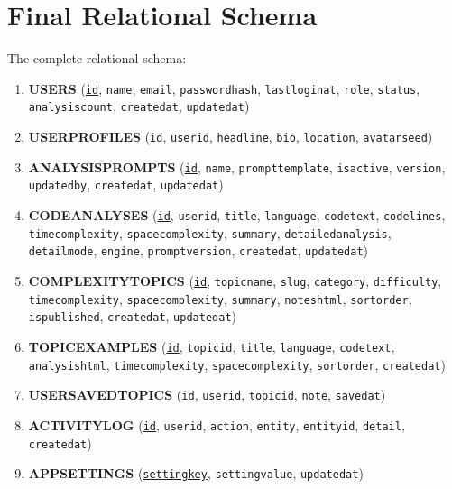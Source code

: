 \documentclass[12pt,a4paper]{report}
\DeclareRobustCommand{\_}{\textunderscore\allowbreak}
\begin{document}
\section{Final Relational Schema}
The complete relational schema:
\begin{enumerate}
    \item \textbf{USERS} (\underline{\texttt{id}}, \texttt{name}, \texttt{email}, \texttt{password\_hash}, \texttt{last\_login\_at}, \texttt{role}, \texttt{status}, \texttt{analysis\_count}, \texttt{created\_at}, \texttt{updated\_at})
    \item \textbf{USER\_PROFILES} (\underline{\texttt{id}}, \texttt{user\_id}, \texttt{headline}, \texttt{bio}, \texttt{location}, \texttt{avatar\_seed})
    \item \textbf{ANALYSIS\_PROMPTS} (\underline{\texttt{id}}, \texttt{name}, \texttt{prompt\_template}, \texttt{is\_active}, \texttt{version}, \texttt{updated\_by}, \texttt{created\_at}, \texttt{updated\_at})
    \item \textbf{CODE\_ANALYSES} (\underline{\texttt{id}}, \texttt{user\_id}, \texttt{title}, \texttt{language}, \texttt{code\_text}, \texttt{code\_lines}, \texttt{time\_complexity}, \texttt{space\_complexity}, \texttt{summary}, \texttt{detailed\_analysis}, \texttt{detail\_mode}, \texttt{engine}, \texttt{prompt\_version}, \texttt{created\_at}, \texttt{updated\_at})
    \item \textbf{COMPLEXITY\_TOPICS} (\underline{\texttt{id}}, \texttt{topic\_name}, \texttt{slug}, \texttt{category}, \texttt{difficulty}, \texttt{time\_complexity}, \texttt{space\_complexity}, \texttt{summary}, \texttt{notes\_html}, \texttt{sort\_order}, \texttt{is\_published}, \texttt{created\_at}, \texttt{updated\_at})
    \item \textbf{TOPIC\_EXAMPLES} (\underline{\texttt{id}}, \texttt{topic\_id}, \texttt{title}, \texttt{language}, \texttt{code\_text}, \texttt{analysis\_html}, \texttt{time\_complexity}, \texttt{space\_complexity}, \texttt{sort\_order}, \texttt{created\_at})
    \item \textbf{USER\_SAVED\_TOPICS} (\underline{\texttt{id}}, \texttt{user\_id}, \texttt{topic\_id}, \texttt{note}, \texttt{saved\_at})
    \item \textbf{ACTIVITY\_LOG} (\underline{\texttt{id}}, \texttt{user\_id}, \texttt{action}, \texttt{entity}, \texttt{entity\_id}, \texttt{detail}, \texttt{created\_at})
    \item \textbf{APP\_SETTINGS} (\underline{\texttt{setting\_key}}, \texttt{setting\_value}, \texttt{updated\_at})
\end{enumerate}
\end{document}
